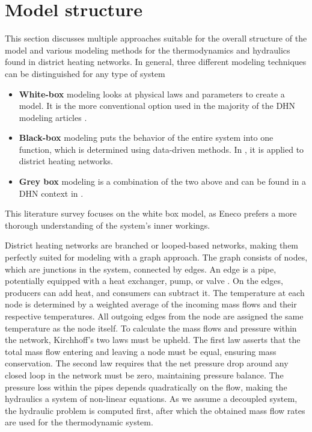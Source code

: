 \section{Model structure}
This section discusses multiple approaches suitable for the overall structure of the model and various modeling methods for the thermodynamics and hydraulics found in district heating networks. In general, three different modeling techniques can be distinguished for any type of system

\begin{itemize}
    \item \textbf{White-box} modeling looks at physical laws and parameters to create a model. It is the more conventional option used in the majority of the DHN modeling articles \cite{sibeijn2025economic,PipePDE}.
    \item \textbf{Black-box} modeling puts the behavior of the entire system into one function, which is determined using data-driven methods. In \cite{GUELPA2016586}\cite{KECEBAS2012339}, it is applied to district heating networks.
    \item \textbf{Grey box} modeling is a combination of the two above and can be found in a DHN context in \cite{grey1}\cite{grey2}. 
\end{itemize}
This literature survey focuses on the white box model, as Eneco prefers a more thorough understanding of the system's inner workings.

District heating networks are branched or looped-based networks, making them perfectly suited for modeling with a graph approach. The graph consists of nodes, which are junctions in the system, connected by edges. An edge is a pipe, potentially equipped with a heat exchanger, pump, or valve \cite{sibeijn2025economic}. On the edges, producers can add heat, and consumers can subtract it. The temperature at each node is determined by a weighted average of the incoming mass flows and their respective temperatures. All outgoing edges from the node are assigned the same temperature as the node itself. To calculate the mass flows and pressure within the network, Kirchhoff's two laws must be upheld. The first law asserts that the total mass flow entering and leaving a node must be equal, ensuring mass conservation. The second law requires that the net pressure drop around any closed loop in the network must be zero, maintaining pressure balance. The pressure loss within the pipes depends quadratically on the flow, making the hydraulics a system of non-linear equations. As we assume a decoupled system, the hydraulic problem is computed first, after which the obtained mass flow rates are used for the thermodynamic system. 

